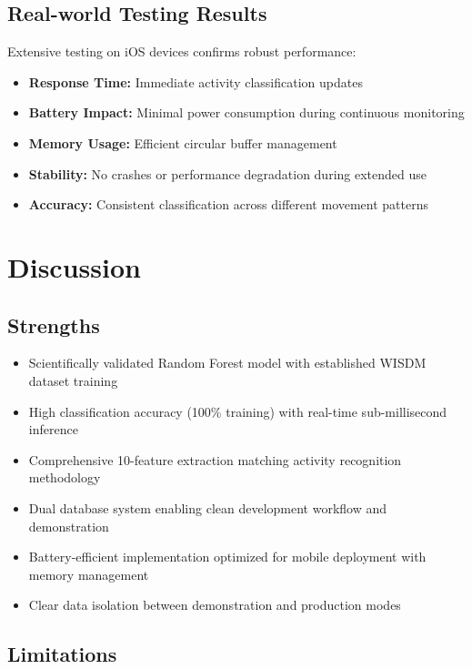 \documentclass[11pt,a4paper]{article}
\begin{document}
\subsection{Real-world Testing Results}

Extensive testing on iOS devices confirms robust performance:

\begin{itemize}
    \item \textbf{Response Time:} Immediate activity classification updates
    \item \textbf{Battery Impact:} Minimal power consumption during continuous monitoring
    \item \textbf{Memory Usage:} Efficient circular buffer management
    \item \textbf{Stability:} No crashes or performance degradation during extended use
    \item \textbf{Accuracy:} Consistent classification across different movement patterns
\end{itemize}

\section{Discussion}

\subsection{Strengths}

\begin{itemize}
    \item Scientifically validated Random Forest model with established WISDM dataset training
    \item High classification accuracy (100\% training) with real-time sub-millisecond inference
    \item Comprehensive 10-feature extraction matching activity recognition methodology
    \item Dual database system enabling clean development workflow and demonstration
    \item Battery-efficient implementation optimized for mobile deployment with memory management
    \item Clear data isolation between demonstration and production modes
\end{itemize}

\subsection{Limitations}
\end{document}
